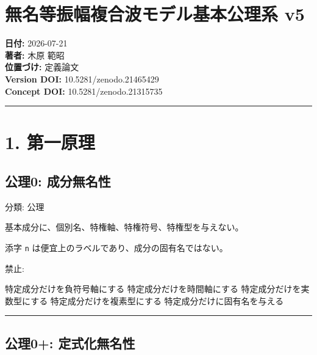 \documentclass[
  a4paper,
]{ltjsarticle}
\author{}
\date{}
\newenvironment{Shaded}{}{}
\newcommand{\NormalTok}[1]{#1}
\begin{document}
\section{無名等振幅複合波モデル基本公理系
v5}\label{ux7121ux540dux7b49ux632fux5e45ux8907ux5408ux6ce2ux30e2ux30c7ux30ebux57faux672cux516cux7406ux7cfb-v5}

\textbf{日付:} 2026-07-21\\
\textbf{著者:} 木原 範昭\\
\textbf{位置づけ:} 定義論文\\
\textbf{Version DOI:} 10.5281/zenodo.21465429\\
\textbf{Concept DOI:} 10.5281/zenodo.21315735

\begin{center}\rule{0.5\linewidth}{0.5pt}\end{center}

\section{1. 第一原理}\label{ux7b2cux4e00ux539fux7406}

\subsection{公理0:
成分無名性}\label{ux516cux74060-ux6210ux5206ux7121ux540dux6027}

分類: 公理

基本成分に、個別名、特権軸、特権符号、特権型を与えない。

添字 \texttt{n} は便宜上のラベルであり、成分の固有名ではない。

禁止:

\begin{Shaded}
\begin{Highlighting}[]
\NormalTok{特定成分だけを負符号軸にする}
\NormalTok{特定成分だけを時間軸にする}
\NormalTok{特定成分だけを実数型にする}
\NormalTok{特定成分だけを複素型にする}
\NormalTok{特定成分だけに固有名を与える}
\end{Highlighting}
\end{Shaded}

\begin{center}\rule{0.5\linewidth}{0.5pt}\end{center}

\subsection{公理0+:
定式化無名性}\label{ux516cux74060-ux5b9aux5f0fux5316ux7121ux540dux6027}
\end{document}
